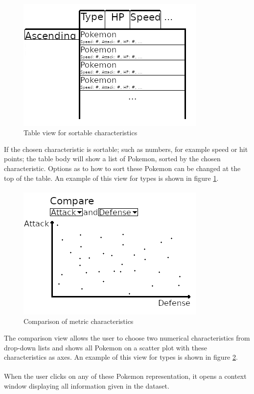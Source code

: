 \documentclass[12pt, a4paper]{article}
\begin{document}
		\paragraph{}
			\begin{figure}[h]
				\centering
				\includegraphics[width=0.5\linewidth]{table-s.png}
				\caption{Table view for sortable characteristics}
				\label{fig:s}
			\end{figure}
			If the chosen characteristic is sortable; such as numbers, for example speed or hit points; the table body will show a list of Pokemon, sorted by the chosen characteristic. Options as to how to sort these Pokemon can be changed at the top of the table. An example of this view for types is shown in figure \ref{fig:s}.
		\paragraph{}
			\begin{figure}[h]
				\centering
				\includegraphics[width=0.5\linewidth]{comparison.png}
				\caption{Comparison of metric characteristics}
				\label{fig:c}
			\end{figure}
			The comparison view allows the user to choose two numerical characteristics from drop-down lists and shows all Pokemon on a scatter plot with these characteristics as axes. An example of this view for types is shown in figure \ref{fig:c}.
		\paragraph{}
			When the user clicks on any of these Pokemon representation, it opens a context window displaying all information given in the dataset.
\end{document}
